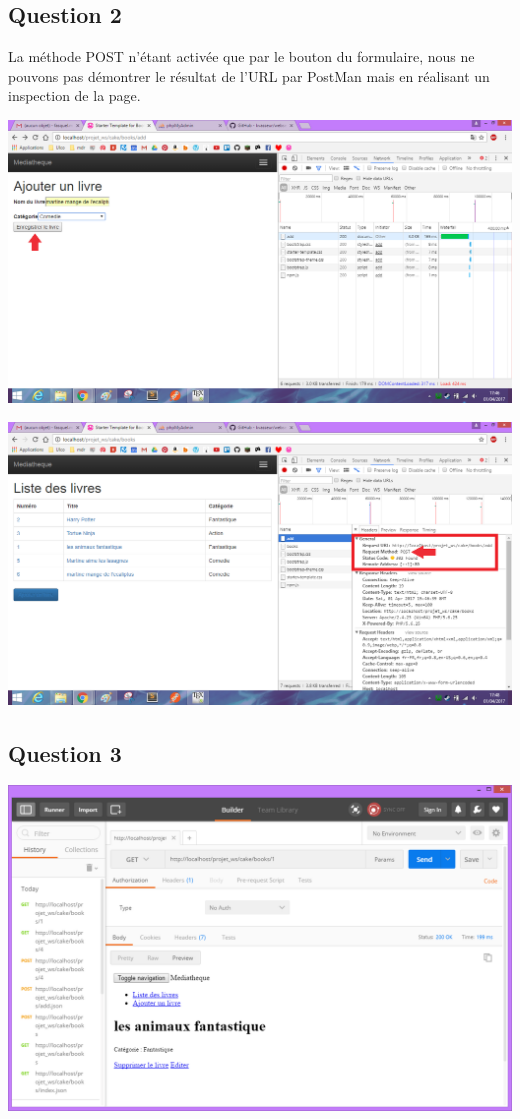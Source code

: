 \documentclass{report}
\begin{document}
		\subsection{Question 2}
		La m\'{e}thode POST n'\'{e}tant activ\'{e}e que par le bouton du formulaire, nous ne pouvons pas d\'{e}montrer le r\'{e}sultat de l'URL par PostMan mais en r\'{e}alisant un inspection de la page.
		\begin{center}
			\includegraphics[scale=0.4]{img/resultats/q2,1.png} 
		\end{center} 
		\begin{center}
			\includegraphics[scale=0.4]{img/resultats/q2,2.png} 
		\end{center}	
		\subsection{Question 3}
		\begin{center}
			\includegraphics[scale=0.4]{img/resultats/q3.png} 
		\end{center} 
\end{document}
